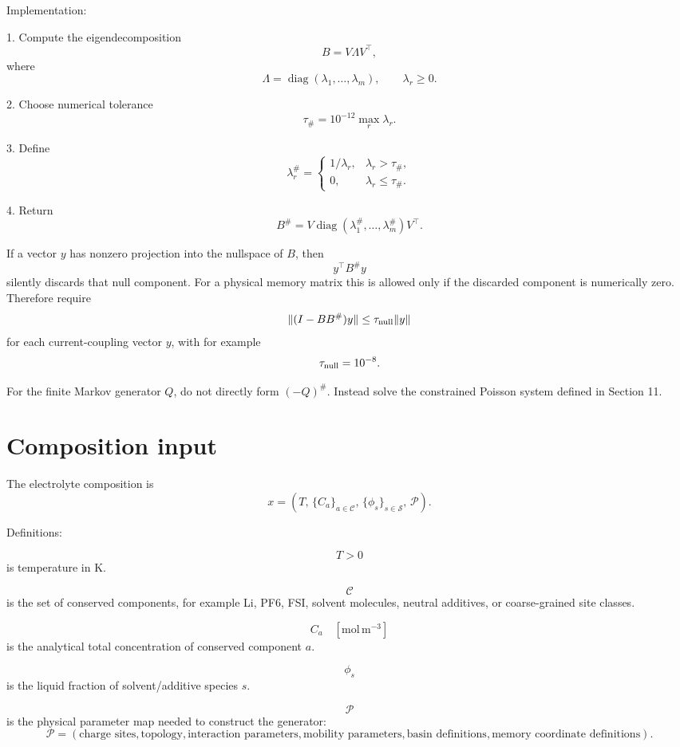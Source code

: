 \documentclass[11pt]{article}
\newcommand{\diag}{\operatorname{diag}}
\begin{document}
  Implementation:

  1. Compute the eigendecomposition
  \[
  B=V\Lambda V^\top,
  \]
  where
  \[
  \Lambda=\diag(\lambda_1,\ldots,\lambda_m),
  \qquad
  \lambda_r\ge0.
  \]

  2. Choose numerical tolerance
  \[
  \tau_{\#}=10^{-12}\max_r \lambda_r.
  \]

  3. Define
  \[
  \lambda_r^\#=
  \begin{cases}
  1/\lambda_r, & \lambda_r>\tau_{\#},\\
  0, & \lambda_r\le\tau_{\#}.
  \end{cases}
  \]

  4. Return
  \[
  B^\#=V\diag(\lambda_1^\#,\ldots,\lambda_m^\#)V^\top.
  \]

  If a vector \(y\) has nonzero projection into the nullspace of \(B\), then
  \[
  y^\top B^\# y
  \]
  silently discards that null component. For a physical memory matrix this is
  allowed only if the discarded component is numerically zero. Therefore require
  \[
  \|(I-BB^\#)y\| \le \tau_{\rm null}\|y\|
  \]
  for each current-coupling vector \(y\), with for example
  \[
  \tau_{\rm null}=10^{-8}.
  \]

  For the finite Markov generator \(Q\), do not directly form \((-Q)^\#\).
  Instead solve the constrained Poisson system defined in Section 11.

  \section{Composition input}

  The electrolyte composition is
  \[
  x=
  \left(
  T,\,
  \{C_a\}_{a\in\mathcal C},\,
  \{\phi_s\}_{s\in\mathcal S},\,
  \mathcal P
  \right).
  \]

  Definitions:

  \[
  T>0
  \]
  is temperature in K.

  \[
  \mathcal C
  \]
  is the set of conserved components, for example Li, PF6, FSI, solvent molecules,
  neutral additives, or coarse-grained site classes.

  \[
  C_a
  \quad [\mathrm{mol\,m^{-3}}]
  \]
  is the analytical total concentration of conserved component \(a\).

  \[
  \phi_s
  \]
  is the liquid fraction of solvent/additive species \(s\).

  \[
  \mathcal P
  \]
  is the physical parameter map needed to construct the generator:
  \[
  \mathcal P
  =
  \left(
  \text{charge sites},
  \text{topology},
  \text{interaction parameters},
  \text{mobility parameters},
  \text{basin definitions},
  \text{memory coordinate definitions}
  \right).
  \]
\end{document}
